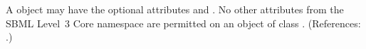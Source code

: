 A \ListOfModifierSpeciesReferences object may have the optional attributes
 and .  No other attributes from the SBML
Level~3 Core namespace are permitted on an object of class
\ListOfModifierSpeciesReferences.  (References: .)
